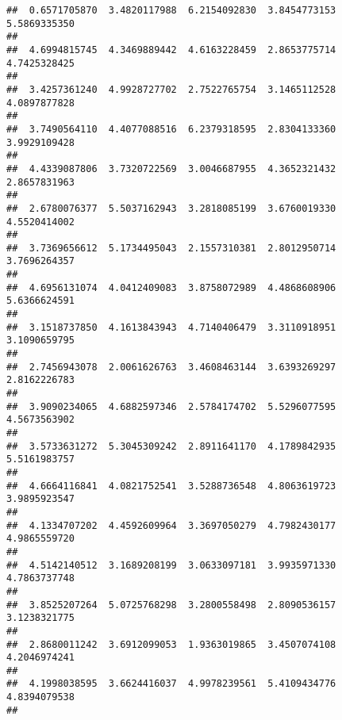 \documentclass[]{article}
\begin{document}
\begin{verbatim}
##  0.6571705870  3.4820117988  6.2154092830  3.8454773153  5.5869335350 
##                                                                       
##  4.6994815745  4.3469889442  4.6163228459  2.8653775714  4.7425328425 
##                                                                       
##  3.4257361240  4.9928727702  2.7522765754  3.1465112528  4.0897877828 
##                                                                       
##  3.7490564110  4.4077088516  6.2379318595  2.8304133360  3.9929109428 
##                                                                       
##  4.4339087806  3.7320722569  3.0046687955  4.3652321432  2.8657831963 
##                                                                       
##  2.6780076377  5.5037162943  3.2818085199  3.6760019330  4.5520414002 
##                                                                       
##  3.7369656612  5.1734495043  2.1557310381  2.8012950714  3.7696264357 
##                                                                       
##  4.6956131074  4.0412409083  3.8758072989  4.4868608906  5.6366624591 
##                                                                       
##  3.1518737850  4.1613843943  4.7140406479  3.3110918951  3.1090659795 
##                                                                       
##  2.7456943078  2.0061626763  3.4608463144  3.6393269297  2.8162226783 
##                                                                       
##  3.9090234065  4.6882597346  2.5784174702  5.5296077595  4.5673563902 
##                                                                       
##  3.5733631272  5.3045309242  2.8911641170  4.1789842935  5.5161983757 
##                                                                       
##  4.6664116841  4.0821752541  3.5288736548  4.8063619723  3.9895923547 
##                                                                       
##  4.1334707202  4.4592609964  3.3697050279  4.7982430177  4.9865559720 
##                                                                       
##  4.5142140512  3.1689208199  3.0633097181  3.9935971330  4.7863737748 
##                                                                       
##  3.8525207264  5.0725768298  3.2800558498  2.8090536157  3.1238321775 
##                                                                       
##  2.8680011242  3.6912099053  1.9363019865  3.4507074108  4.2046974241 
##                                                                       
##  4.1998038595  3.6624416037  4.9978239561  5.4109434776  4.8394079538 
##                                                                       

\end{verbatim}
\end{document}
